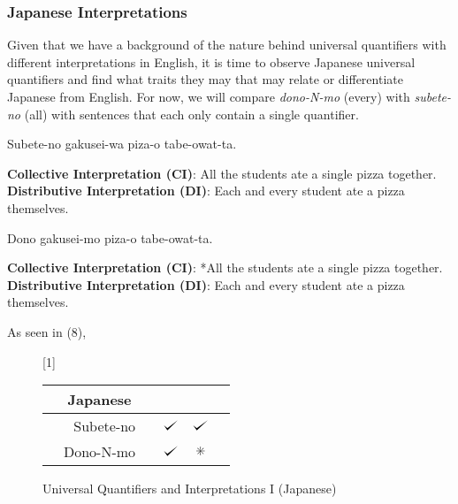 \documentclass[english, 11pt]{article}
\newcommand{\dwork}{\text{\ding{83}}}
\def\checkmark{\tikz\fill[scale=0.4](0,.35) -- (.25,0) -- (1,.7) -- (.25,.15) -- cycle;}
\begin{document}
\subsubsection{Japanese Interpretations}
Given that we have a background of the nature behind universal quantifiers with different interpretations in English, it is time to observe Japanese universal quantifiers and find what traits they may that may relate or differentiate Japanese from English. For now, we will compare \emph{dono-N-mo} (every) with \emph{subete-no} (all) with sentences that each only contain a single quantifier.
\begin{exe}
	\ex 
	\begin{xlist}
		\label{1b}
		\label{1a}
	\end{xlist}
\end{exe}
\begin {exe}
	\ex 
		\begin {xlist}
			\ex Subete-no gakusei-wa piza-o tabe-owat-ta.
				\begin {xlist} 
					\ex \textbf{Collective Interpretation (CI)}: All the students ate a single pizza together.
					\ex \textbf{Distributive Interpretation (DI)}: Each and every student ate a pizza themselves.
				\end {xlist}
			\ex Dono gakusei-mo piza-o tabe-owat-ta.
			\begin {xlist} 
				\ex \textbf{Collective Interpretation (CI)}: *All the students ate a single pizza together.
				\ex \textbf{Distributive Interpretation (DI)}: Each and every student ate a pizza themselves.
			\end {xlist}
	\end {xlist}
\end {exe}
As seen in (8), 
\begin{figure}[h]
	\begin{center} \renewcommand*\arraystretch{1.2}
	\scalebox{1}[1]{\begin{tabular}[t]{|rrl||c|c|c|} \hline 
	\multicolumn{3}{|c||}{Japanese} & \sc{Distributive} & \sc{Collective}  \\[0.5ex]
  	 	\hline & Subete-no 		& & $\checkmark$ & $\checkmark$ \\
		\hline & Dono-N-mo		& & $\checkmark$ & $\dwork$ \\
   	 	\hline 
	\end{tabular}} \renewcommand*\arraystretch{1} \end{center}
	\vspace*{-5mm}
	\captionsetup{labelfont=bf}
	\caption[labelfont=bf]{Universal Quantifiers and Interpretations I (Japanese)}
\end{figure}
\end{document}
